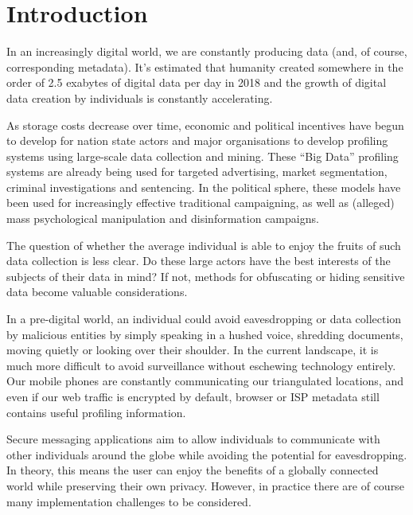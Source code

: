 \documentclass{mproj}
\begin{document}
\chapter{Introduction}\label{intro} \setcounter{page}{1} 

In an increasingly digital world, we are constantly producing data (and, of course, corresponding metadata). It's estimated that humanity created somewhere in the order of 2.5 exabytes of digital data per day in 2018\cite{baeza2022attention} and the growth of digital data creation by individuals is constantly accelerating.\cite{baeza2022attention} 

As storage costs decrease over time\cite{walter2005kryder}, economic and political incentives have begun to develop for nation state actors and major organisations to develop profiling systems using large-scale data collection and mining. These ``Big Data'' profiling systems are already being used for targeted advertising\cite{farahat2012effective}, market segmentation\cite{pantelis2013understanding}, criminal investigations\cite{zawoad2015digital} and sentencing\cite{simmons2017big}. In the political sphere, these models have been used for increasingly effective traditional campaigning, \cite{kreiss2019arbiters} as well as (alleged) mass psychological manipulation\cite{berghel2018malice} and disinformation\cite{stocker2019facebook} campaigns.

The question of whether the average individual is able to enjoy the fruits of such data collection is less clear. Do these large actors have the best interests of the subjects of their data in mind? If not, methods for obfuscating or hiding sensitive data become valuable considerations.

In a pre-digital world, an individual could avoid eavesdropping or data collection by malicious entities by simply speaking in a hushed voice, shredding documents, moving quietly or looking over their shoulder. In the current landscape, it is much more difficult to avoid surveillance without eschewing technology entirely. Our mobile phones are constantly communicating our triangulated locations, and even if our web traffic is encrypted by default, browser or ISP metadata still contains useful profiling information.

Secure messaging applications aim to allow individuals to communicate with other individuals around the globe while avoiding the potential for eavesdropping. In theory, this means the user can enjoy the benefits of a globally connected world while preserving their own privacy. However, in practice there are of course many implementation challenges to be considered.
\end{document}
